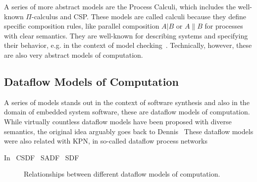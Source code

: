 A series of more abstract models are the Process Calculi, which includes the well-known $\Pi$-calculus and \ac{CSP}.
These models are called calculi because they define specific composition rules, like parallel composition $A | B$ or $A \| B$ for processes with clear semantics. 
They are well-known for describing systems and specifying their behavior, e.g. in the context of model checking~\cite{baier_mc}.
Technically, however, these are also very abstract models of computation.

\subsection{Dataflow Models of Computation}

A series of models stands out in the context of software synthesis and also in the domain of embedded system software, these are dataflow models of computation.
While virtually countless dataflow models have been proposed with diverse semantics, the original idea arguably goes back to Dennis~\cite{dennis1974first,dennis1986data}
These dataflow models were also related with \ac{KPN}, in so-called dataflow process networks~\cite{lee1995dataflow,lee_matsikoudis_semantics}



In~\cite{Parks:M95/105} 
\ac{CSDF}~\cite{bilsen1996cycle}
\ac{SADF}~\cite{theelen2006scenario}
\ac{SDF}~\cite{lee1987sdf}




\begin{figure}[h]
	\centering
   \resizebox{0.55\textwidth}{!}{}
	\caption{Relationships between different dataflow models of computation.}
	\label{fig:dataflow_mocs}
\end{figure}

